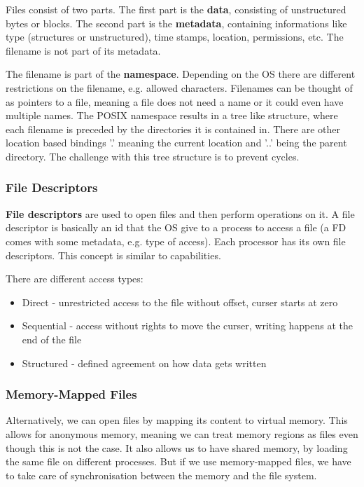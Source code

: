 Files consist of two parts. The first part is the \textbf{data}, consisting of unstructured bytes or blocks. The second part is the \textbf{metadata}, containing informations like type (structures or unstructured), time stamps, location, permissions, etc. The filename is not part of its metadata. \medskip

The filename is part of the \textbf{namespace}. Depending on the OS there are different restrictions on the filename, e.g. allowed characters. Filenames can be thought of as pointers to a file, meaning a file does not need a name or it could even have multiple names. The POSIX namespace results in a tree like structure, where each filename is preceded by the directories it is contained in. There are other location based bindings '.' meaning the current location and '..' being the parent directory. The challenge with this tree structure is to prevent cycles. \medskip

\subsubsection{File Descriptors}

\textbf{File descriptors} are used to open files and then perform operations on it. A file descriptor is basically an id that the OS give to a process to access a file (a FD comes with some metadata, e.g. type of access). Each processor has its own file descriptors. This concept is similar to capabilities. \medskip

There are different access types:
\begin{itemize}
	\item Direct - unrestricted access to the file without offset, curser starts at zero
	\item Sequential - access without rights to move the curser, writing happens at the end of the file
	\item Structured - defined agreement on how data gets written
\end{itemize}

\subsubsection{Memory-Mapped Files}

Alternatively, we can open files by mapping its content to virtual memory. This allows for anonymous memory, meaning we can treat memory regions as files even though this is not the case. It also allows us to have shared memory, by loading the same file on different processes. But if we use memory-mapped files, we have to take care of synchronisation between the memory and the file system.

